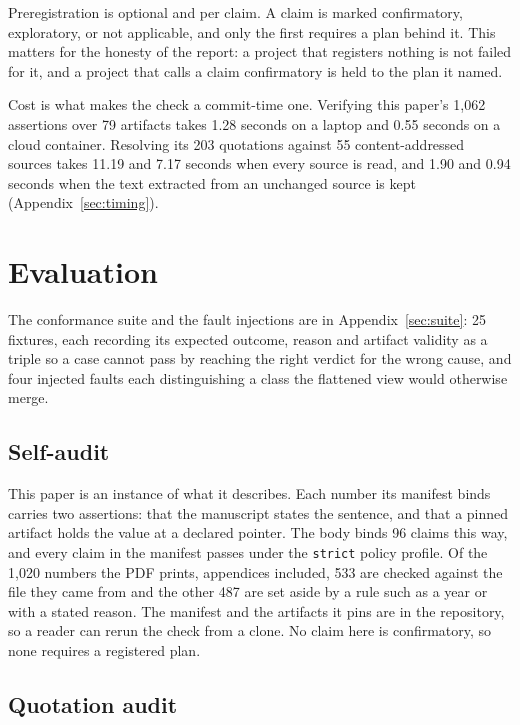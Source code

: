 \documentclass{article}
\newcommand{\code}[1]{\texttt{#1}}
\begin{document}
Preregistration is optional and per claim. A claim is marked confirmatory, exploratory, or not
applicable, and only the first requires a plan behind it. This matters for the honesty of the
report: a project that registers nothing is not failed for it, and a project that calls a claim
confirmatory is held to the plan it named.

Cost is what makes the check a commit-time one. Verifying this paper's 1{,}062 assertions over 79
artifacts takes 1.28 seconds on a laptop and 0.55 seconds on a cloud container. Resolving its 203
quotations against 55 content-addressed sources takes 11.19 and 7.17 seconds when every source is
read, and 1.90 and 0.94 seconds when the text extracted from an unchanged source is kept
(Appendix~\ref{sec:timing}).

\section{Evaluation}
\label{sec:eval}

The conformance suite and the fault injections are in Appendix~\ref{sec:suite}: 25 fixtures,
each recording its expected outcome, reason and artifact validity as a triple so a case
cannot pass by reaching the right verdict for the wrong cause, and four injected faults each
distinguishing a class the flattened view would otherwise merge.

\subsection{Self-audit}
\label{sec:selfaudit}

This paper is an instance of what it describes. Each number its manifest binds carries two assertions: that the manuscript states
the sentence, and that a pinned artifact holds the value at a declared pointer. The body binds
96 claims this way, and every claim in the manifest passes under the \code{strict} policy
profile. Of the 1{,}020 numbers the PDF prints, appendices included, 533 are checked against the
file they came from and the other 487 are set aside by a rule such as a year or with a stated reason. The manifest and the artifacts it pins are in the repository, so a reader can
rerun the check from a clone. No claim here is confirmatory, so none requires a
registered plan.

\subsection{Quotation audit}
\label{sec:quote}
\end{document}
